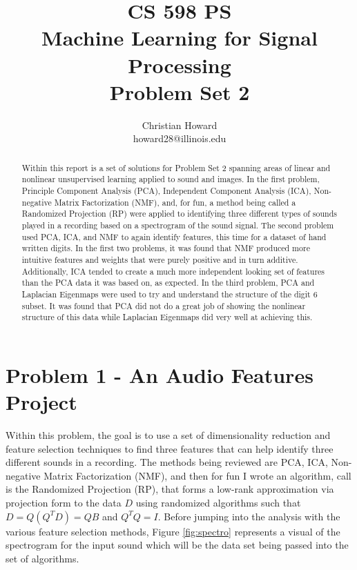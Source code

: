 \documentclass{article}[12pt]
\title{CS 598 PS \\ Machine Learning for Signal Processing \\ Problem Set 2}
\author{
Christian Howard \\ howard28@illinois.edu
}
\date{} %
\begin{document}
   
   \maketitle
   \begin{abstract}
   	Within this report is a set of solutions for Problem Set 2 spanning areas of linear and nonlinear unsupervised learning applied to sound and images. In the first problem, Principle Component Analysis (PCA), Independent Component Analysis (ICA), Non-negative Matrix Factorization (NMF), and, for fun, a method being called a Randomized Projection (RP) were applied to identifying three different types of sounds played in a recording based on a spectrogram of the sound signal. The second problem used PCA, ICA, and NMF to again identify features, this time for a dataset of hand written digits. In the first two problems, it was found that NMF produced more intuitive features and weights that were purely positive and in turn additive. Additionally, ICA tended to create a much more independent looking set of features than the PCA data it was based on, as expected. In the third problem, PCA and Laplacian Eigenmaps were used to try and understand the structure of the digit 6 subset. It was found that PCA did not do a great job of showing the nonlinear structure of this data while Laplacian Eigenmaps did very well at achieving this.
   \end{abstract}
   \newpage
   
   \tableofcontents
   \newpage
   
   \section{Problem 1 - An Audio Features Project}
   Within this problem, the goal is to use a set of dimensionality reduction and feature selection techniques to find three features that can help identify three different sounds in a recording. The methods being reviewed are PCA, ICA, Non-negative Matrix Factorization (NMF), and then for fun I wrote an algorithm, call is the Randomized Projection (RP), that forms a low-rank approximation via projection form to the data $D$ using randomized algorithms such that $D = Q(Q^T D) = Q B$ and $Q^T Q = I$. Before jumping into the analysis with the various feature selection methods, Figure \ref{fig:spectro} represents a visual of the spectrogram for the input sound which will be the data set being passed into the set of algorithms.
   
\end{document}
